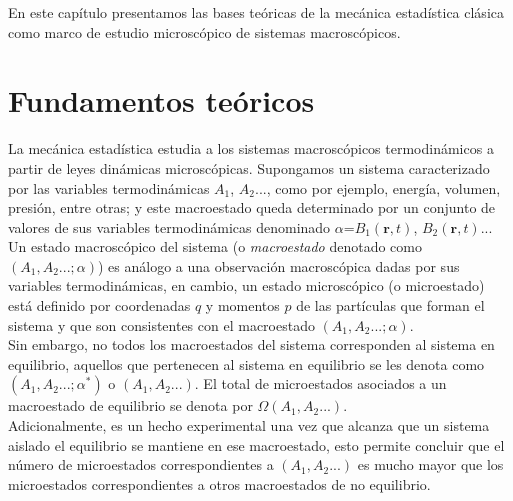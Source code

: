 En este capítulo presentamos las bases teóricas de la mecánica estadística clásica como marco de estudio microscópico de sistemas macroscópicos.

\section{Fundamentos teóricos}

La mecánica estadística estudia a los sistemas macroscópicos termodinámicos a partir de leyes dinámicas microscópicas. Supongamos un sistema caracterizado por las variables termodinámicas $A_1$, $A_2$..., como por ejemplo, energía, volumen, presión, entre otras; y este macroestado queda determinado por un conjunto de valores de sus variables termodinámicas denominado $\alpha$=$B_1(\mathbf{r}, t)$, $B_2(\mathbf{r}, t)$... Un estado macroscópico del sistema (o {\it macroestado} denotado como $(A_1, A_2...;\alpha)$) es análogo a una observación macroscópica dadas por sus variables termodinámicas, en cambio, un estado microscópico (o microestado) está definido por coordenadas $q$ y momentos $p$ de las partículas que forman el sistema y que son consistentes con el macroestado $(A_1, A_2...;\alpha)$.\\

Sin embargo, no todos los macroestados del sistema corresponden al sistema en equilibrio, aquellos que pertenecen al sistema en equilibrio se les denota como $(A_1, A_2...;\alpha^{*})$ o $(A_1, A_2...)$. El total de microestados asociados a un macroestado de equilibrio se denota por $\Omega(A_1, A_2...)$.\\


Adicionalmente, es un hecho experimental una vez que alcanza que un sistema aislado el equilibrio se mantiene en ese macroestado, esto permite concluir que el número de microestados correspondientes a $(A_1, A_2...)$ es mucho mayor que los microestados correspondientes a otros macroestados de no equilibrio.\\


